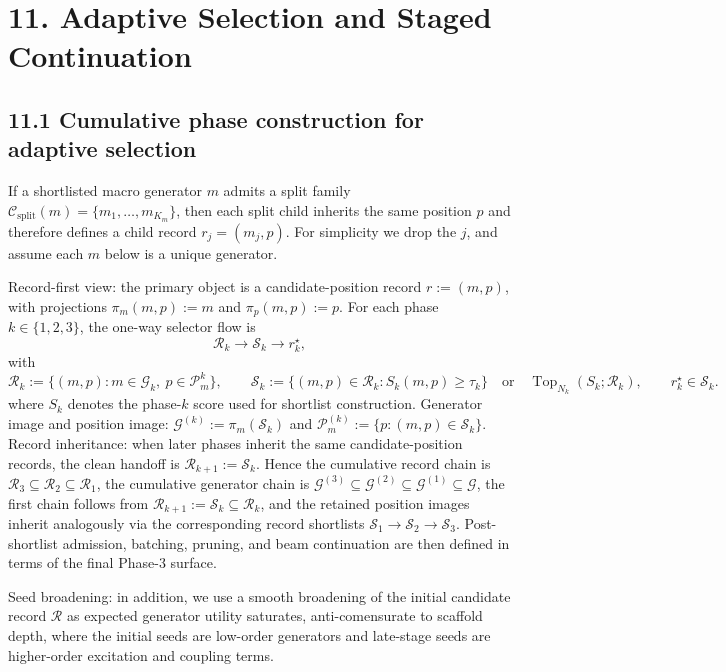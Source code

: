 \documentclass[11pt]{article}
\begin{document}
\section*{11. Adaptive Selection and Staged Continuation}

\subsection*{11.1 Cumulative phase construction for adaptive selection}
If a shortlisted macro generator $m$ admits a split family $\mathcal C_{\mathrm{split}}(m)=\{m_1,\dots,m_{K_m}\}$, then each split child inherits the same position $p$ and therefore defines a child record $r_j=(m_j,p)$. For simplicity we drop the $j$, and assume each $m$ below is a unique generator.

Record-first view: the primary object is a candidate-position record $r:=(m,p)$, with projections \(\pi_m(m,p):=m\) and \(\pi_p(m,p):=p\). For each phase $k \in \{1,2,3\}$, the one-way selector flow is
\[
\mathcal R_k\longrightarrow\mathcal S_k\longrightarrow r_k^\star,
\]
with
\[
\mathcal R_k:=\{(m,p):m\in\mathcal G_k,\ p\in\mathcal P_m^{k}\},
\qquad
\mathcal S_k:=
\{(m,p)\in\mathcal R_k:S_k(m,p)\ge\tau_k\}
\quad\text{or}\quad
\operatorname{Top}_{N_k}\!\left(S_k;\mathcal R_k\right),
\qquad
r_k^\star\in\mathcal S_k.
\]
where \(S_k\) denotes the phase-\(k\) score used for shortlist construction. Generator image and position image: \(\mathcal G^{(k)}:=\pi_m(\mathcal S_k)\) and \(\mathcal P_m^{(k)}:=\{p:(m,p)\in\mathcal S_k\}\). Record inheritance: when later phases inherit the same candidate-position records, the clean handoff is \(\mathcal R_{k+1}:=\mathcal S_k\). Hence the cumulative record chain is \(\mathcal R_3 \subseteq \mathcal R_2 \subseteq \mathcal R_1\), the cumulative generator chain is \(\mathcal G^{(3)} \subseteq \mathcal G^{(2)} \subseteq \mathcal G^{(1)} \subseteq \mathcal G\), the first chain follows from \(\mathcal R_{k+1}:=\mathcal S_k\subseteq\mathcal R_k\), and the retained position images inherit analogously via the corresponding record shortlists \(\mathcal S_1\to\mathcal S_2\to\mathcal S_3\). Post-shortlist admission, batching, pruning, and beam continuation are then defined in terms of the final Phase-3 surface.

Seed broadening: in addition, we use a smooth broadening of the initial candidate record $\mathcal R$ as expected generator utility saturates, anti-comensurate to scaffold depth, where the initial seeds are low-order generators and late-stage seeds are higher-order excitation and coupling terms.
\end{document}
